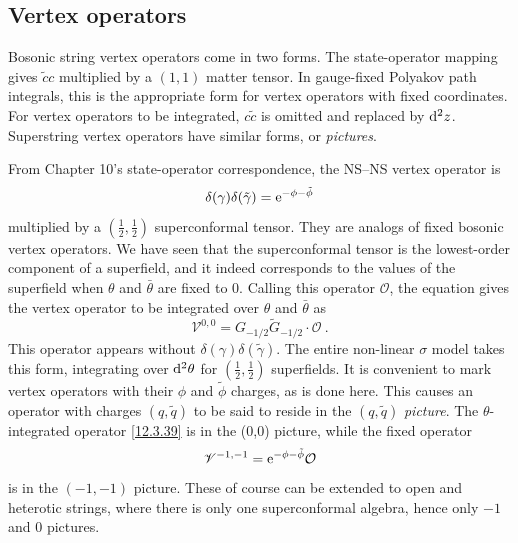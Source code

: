 \subsection*{Vertex operators}

Bosonic string vertex operators come in two forms. The state-operator mapping gives $\tilde{c}c$ multiplied by a $(1,1)$ matter tensor. In gauge-fixed Polyakov path integrals, this is the appropriate form for vertex operators with fixed coordinates. For vertex operators to be integrated, $c\tilde{c}$ is omitted and replaced by $\mathrm{d}^{2}z$. Superstring vertex operators have similar forms, or \textit{pictures}.

From Chapter 10's state-operator correspondence, the NS--NS vertex operator is
\begin{equation}
	\delta(\gamma)\delta(\tilde{\gamma}) = \mathrm{e}^{-\phi-\tilde{\phi}} \label{12.3.38}
\end{equation}
multiplied by a $(\tfrac{1}{2},\tfrac{1}{2})$ superconformal tensor. They are analogs of fixed bosonic vertex operators. We have seen that the superconformal tensor is the lowest-order component of a superfield, and it indeed corresponds to the values of the superfield when $\theta$ and $\bar{\theta}$ are fixed to 0. Calling this operator $\mathcal{O}$, the equation gives the vertex operator to be integrated over $\theta$ and $\bar{\theta}$ as
\begin{equation}
	\mathscr{V}^{0,0}= G_{{-}1/2}\tilde{G}_{{-}1/2} \cdot\mathcal{O} \:. \label{12.3.39}
\end{equation}
This operator appears without $\delta(\gamma)\delta(\tilde{\gamma})$. The entire non-linear $\sigma$ model takes this form, integrating over $\mathrm{d}^{2}\theta$ for $(\tfrac{1}{2},\tfrac{1}{2})$ superfields. It is convenient to mark vertex operators with their $\phi$ and $\tilde{\phi}$ charges, as is done here. This causes an operator with charges $(q,\tilde{q})$ to be said to reside in the $(q,\tilde{q})$ \textit{picture}. The $\theta$-integrated operator \eqref{12.3.39} is in the (0,0) picture, while the fixed operator
\begin{equation}
	\mathscr{V}^{{-}1,{-}1} = \mathrm{e}^{-\phi-\tilde{\phi}}\mathcal{O} \label{12.3.40}
\end{equation}
is in the $(-1,-1)$ picture. These of course can be extended to open and heterotic strings, where there is only one superconformal algebra, hence only $-1$ and $0$ pictures.

